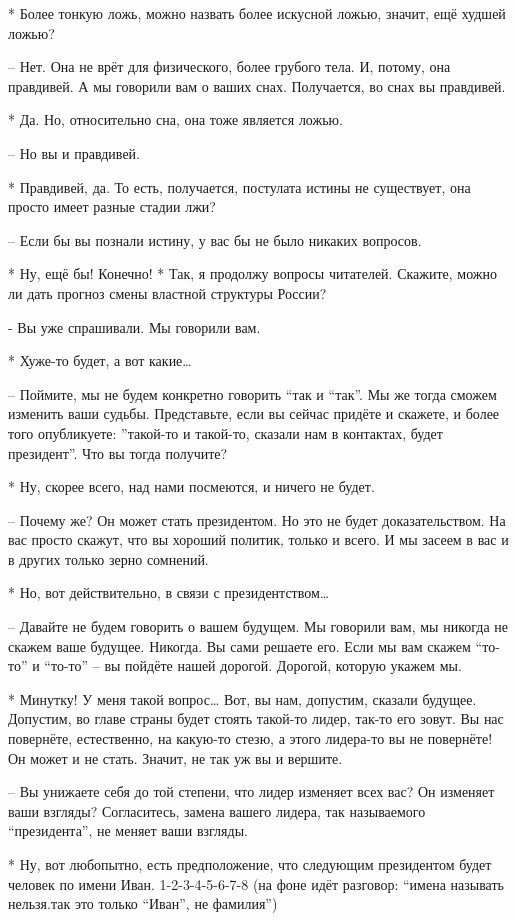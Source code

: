  * Более тонкую ложь, можно назвать более искусной ложью, значит, ещё худшей ложью?

 – Нет. Она не врёт для физического, более грубого тела. И, потому, она правдивей. А мы говорили вам о ваших снах. Получается, во снах вы правдивей.

 * Да. Но, относительно сна, она тоже является ложью.

 – Но вы и правдивей.

 * Правдивей, да. То есть, получается, постулата истины не существует, она просто имеет разные стадии лжи?

 – Если бы вы познали истину, у вас бы не было никаких вопросов.

 * Ну, ещё бы! Конечно!
 * Так, я продолжу вопросы читателей. Скажите, можно ли дать прогноз смены властной структуры России?

 - Вы уже спрашивали. Мы говорили вам.

 * Хуже-то будет, а вот какие…

 – Поймите, мы не будем конкретно говорить “так и “так”. Мы же тогда сможем изменить ваши судьбы. Представьте, если вы сейчас придёте и скажете, и более того опубликуете: ”такой-то и такой-то, сказали нам в контактах, будет президент”. Что вы тогда получите?

 * Ну, скорее всего, над нами посмеются, и ничего не будет.

 – Почему же? Он может стать президентом. Но это не будет доказательством. На вас просто скажут, что вы хороший политик, только и всего. И мы засеем в вас и в других только зерно сомнений.

 * Но, вот действительно, в связи с президентством…

 – Давайте не будем говорить о вашем будущем. Мы говорили вам, мы никогда не скажем ваше будущее. Никогда. Вы сами решаете его. Если мы вам скажем “то-то” и “то-то” – вы пойдёте нашей дорогой. Дорогой, которую укажем мы.

 * Минутку! У меня такой вопрос… Вот, вы нам, допустим, сказали будущее. Допустим, во главе страны будет стоять такой-то лидер, так-то его зовут. Вы нас повернёте, естественно, на какую-то стезю, а этого лидера-то  вы не повернёте! Он может и не стать. Значит, не так уж вы и вершите.

 – Вы унижаете себя до той степени, что лидер изменяет всех вас? Он изменяет ваши взгляды? Согласитесь, замена вашего лидера, так называемого “президента”, не меняет ваши взгляды.

 * Ну, вот любопытно, есть предположение, что следующим президентом будет человек по имени Иван.
 1-2-3-4-5-6-7-8 (на фоне идёт разговор: “имена называть нельзя.так это только “Иван”, не фамилия”)

